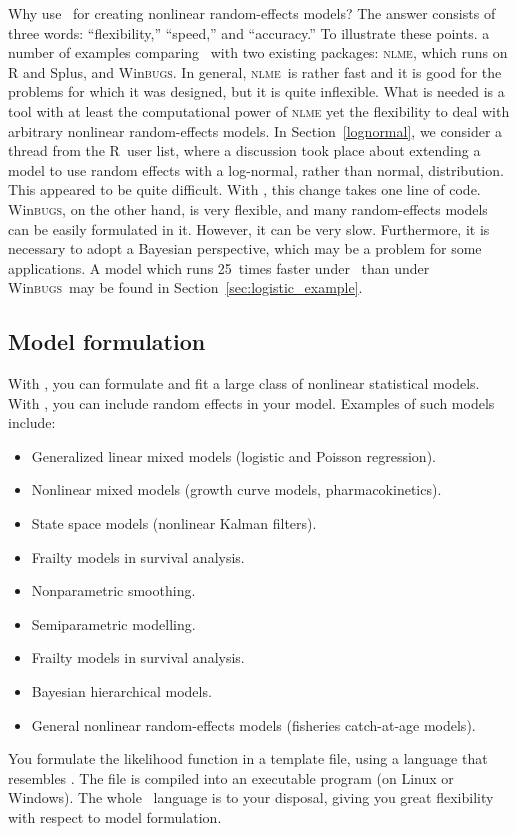 \documentclass{admbmanual}
\newcommand{\scNLME}{\textsc{nlme}}
\newcommand{\scWinBUGS}{Win\textsc{bugs}}
\begin{document}
Why use \ADM\ for creating nonlinear random-effects models? The answer consists
of three words: ``flexibility,'' ``speed,'' and ``accuracy.'' To illustrate
these points. a number of examples comparing \scAR\ with two existing packages:
\textsc{nlme}, which runs on R and Splus, and \scWinBUGS. In general, \scNLME\
is rather fast and it is good for the problems for which it was designed, but it
is quite inflexible. What is needed is a tool with at least the computational
power of \textsc{nlme} yet the flexibility to deal with arbitrary nonlinear
random-effects models. In Section~\ref{lognormal}, we consider a thread from the
R~user list, where a discussion took place about extending a model to use random
effects with a log-normal, rather than normal, distribution. This appeared to be
quite difficult. With \scAR, this change takes one line of code. \scWinBUGS, on
the other hand, is very flexible, and many random-effects models can be easily
formulated in it. However, it can be very slow. Furthermore, it is necessary to
adopt a Bayesian perspective, which may be a problem for some applications. A
model which runs 25~times faster under \scAB\ than under \scWinBUGS\ may be
found in Section~\ref{sec:logistic_example}.

\subsection{Model formulation}

With \scAB, you can formulate and fit a large class of nonlinear statistical
models. With \scAR, you can include random effects in your model. Examples of
such models include:
\begin{itemize}
  \item Generalized linear mixed models (logistic and Poisson regression).
  \item Nonlinear mixed models (growth curve models, pharmacokinetics).
  \item State space models (nonlinear Kalman filters).
  \item Frailty models in survival analysis.
  \item Nonparametric smoothing.
  \item Semiparametric modelling.
  \item Frailty models in survival analysis.
  \item Bayesian hierarchical models.
  \item General nonlinear random-effects models (fisheries catch-at-age models).
\end{itemize}
You formulate the likelihood function in a template file, using a language that
resembles \cplus. The file is compiled into an executable program (on Linux or
Windows). The whole \cplus\ language is to your disposal, giving you great
flexibility with respect to model formulation.
\end{document}
